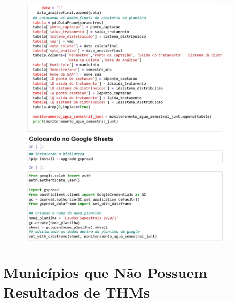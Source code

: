 \begin{apendicesenv}
\begin{figure}[!htb]
\centering
\includegraphics[scale=0.4]{colab/laudos 4.png}
\label{fig04}
\end{figure}

\chapter{Municípios que Não Possuem Resultados de THMs}


\end{apendicesenv}
